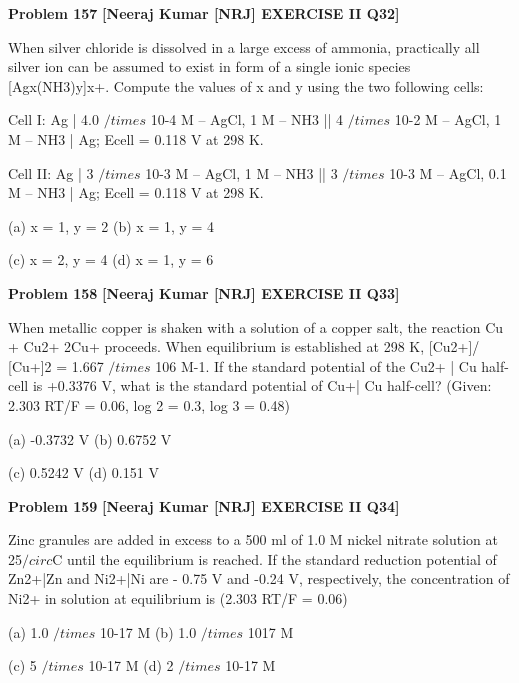 \begin{problembox}
\textbf{Problem 157} \hfill \textbf{[Neeraj Kumar [NRJ] EXERCISE II Q32]}
\label{q:ext-nrj_all_questions-157}

When silver chloride is dissolved in a large excess 
of ammonia, practically all silver ion can be 
assumed to exist in form of a single ionic species 
[Agx(NH3)y]x+. Compute the values of x and y 
using the two following cells:
 
 Cell I:  Ag | 4.0 $/times$ 10-4 M -- AgCl, 1 M 
--  NH3  || 4 $/times$ 10-2 M -- AgCl, 1 M 
-- NH3 | Ag; Ecell = 0.118 V at 298 K.
 
 Cell II:  Ag | 3 $/times$ 10-3 M -- AgCl, 1 M 
-- NH3 || 3 $/times$ 10-3 M -- AgCl, 0.1  M 
-- NH3 | Ag; Ecell = 0.118 V at 298 K.
 
 (a) x = 1, y = 2 
(b) x = 1, y = 4
 
 (c) x = 2, y = 4 
(d) x = 1, y = 6
\end{problembox}

\begin{problembox}
\textbf{Problem 158} \hfill \textbf{[Neeraj Kumar [NRJ] EXERCISE II Q33]}
\label{q:ext-nrj_all_questions-158}

When metallic copper is shaken with a solution 
of a copper salt, the reaction Cu + Cu2+   2Cu+ 
proceeds. When equilibrium is established at 298 
K, [Cu2+]/ [Cu+]2 = 1.667 $/times$ 106 M-1. If the standard 
potential of the Cu2+ | Cu half-cell is +0.3376 V, 
what is the standard potential of Cu+| Cu half-cell? 
(Given: 2.303 RT/F = 0.06, log 2 = 0.3, log 3 = 0.48)
 
 (a) -0.3732 V 
(b) 0.6752 V
 
 (c) 0.5242 V 
(d) 0.151 V
\end{problembox}

\begin{problembox}
\textbf{Problem 159} \hfill \textbf{[Neeraj Kumar [NRJ] EXERCISE II Q34]}
\label{q:ext-nrj_all_questions-159}

Zinc granules are added in excess to a 500 ml of 
1.0 M nickel nitrate solution at 25$/circ$C until the 
equilibrium is reached. If the standard reduction 
potential of Zn2+|Zn and Ni2+|Ni are - 0.75 V and 
-0.24 V, respectively, the concentration of Ni2+ in 
solution at equilibrium is (2.303 RT/F = 0.06)
 
 (a) 1.0 $/times$ 10-17 M 
(b) 1.0 $/times$ 1017 M
 
 (c) 5 $/times$ 10-17 M 
(d) 2 $/times$ 10-17 M
\end{problembox}

